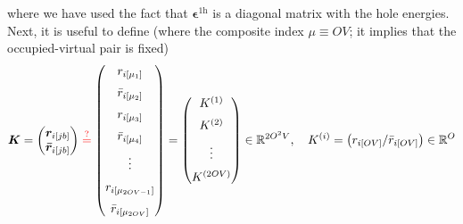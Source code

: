 where we have used the fact that $\bm{\epsilon}^{1\mathrm{h}}$ is a diagonal matrix with the hole energies. Next, it is useful to define (where the composite index $\mu \equiv OV$; it implies that the occupied-virtual pair is fixed)
\begin{align}
    \bm{K} = \begin{pmatrix}
\bm{r}_{i[jb]} \\
\bm{\bar{r}}_{i[{jb}]} \\
\end{pmatrix}  \color{red} \stackrel{?}{=} \color{black} \begin{pmatrix}
r_{i[\mu_1]} \\[6pt]
\bar{r}_{i[\mu_2]} \\[6pt]
r_{i[\mu_3]} \\[6pt]
\bar{r}_{i[\mu_4]} \\[6pt]
\vdots \\[6pt]
r_{i[\mu_{2OV-1}]} \\[6pt]
\bar{r}_{i[\mu_{2OV}]}
\end{pmatrix} = \begin{pmatrix}
K^{(1)} \\[6pt]
K^{(2)} \\[6pt]
\vdots \\[6pt]
K^{(2OV)}
\end{pmatrix} \in \mathbb{R}^{2O^2V},
\quad
K^{(i)} = \begin{pmatrix}
r_{i[OV]}/\bar{r}_{i[OV]}
\end{pmatrix} \in \mathbb{R}^{O}
\end{align} 
